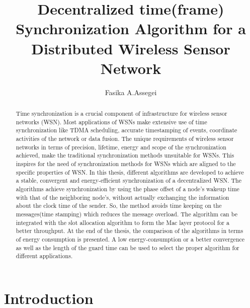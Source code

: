 \documentclass[a4paper,8pt]{report}
\title{Decentralized time(frame) Synchronization Algorithm for a Distributed Wireless Sensor Network}
\author{Fasika A.Assegei}
\begin{document}
\maketitle
\newpage
\begin{abstract}
Time synchronization is a crucial component of infrastructure for
wireless sensor networks (WSN). Most applications of WSNs make
extensive use of time synchronization like TDMA scheduling, accurate
timestamping of events, coordinate activities of the network or data
fusion. The unique requirements of wireless sensor networks in terms
of precision, lifetime, energy and scope of the synchronization
achieved, make the traditional synchronization methods unsuitable
for WSNs. This inspires for the need of synchronization methods for
WSNs which are aligned to the specific properties of WSN. In this
thesis, different algorithms are developed to achieve a stable,
convergent and energy-efficient synchronization of a decentralized
WSN. The algorithms achieve synchronization by using the phase
offset of a node's wakeup time with that of the neighboring node's,
without actually exchanging the information about the clock time of
the sender. So, the method avoids time keeping on the messages(time
stamping) which reduces the message overload. The algorithm can be
integrated with the slot allocation algorithm to form the Mac layer
protocol for a better throughput. At the end of the thesis, the
comparison of the algorithms in terms of energy consumption is
presented. A low energy-consumption or a better convergence as well
as the length of the guard time can be used to select the proper
algorithm for different applications.
\end{abstract}
\newpage
\tableofcontents
\newpage
\newpage
\listoffigures
\newpage
\chapter{Introduction}
\end{document}
